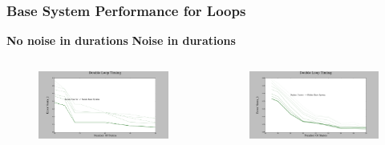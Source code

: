 \documentclass{beamer}
\begin{document}


\begin{frame}
\frametitle{Base System Performance for Loops}




\hspace{1cm} \textbf{No noise in durations}
\hspace{2.5cm} \textbf{Noise in durations}

\begin{columns}[c]

\begin{figure}

\includegraphics[width=1.0\linewidth]{lucasplots/monImages/DoubleLoopTiming0.png}
\end{figure}

\begin{figure}
\includegraphics[width=1.0\linewidth]{lucasplots/monImages/DoubleLoopTiming0_1.png}
\end{figure}


\end{columns}
\end{frame}
\end{document}
